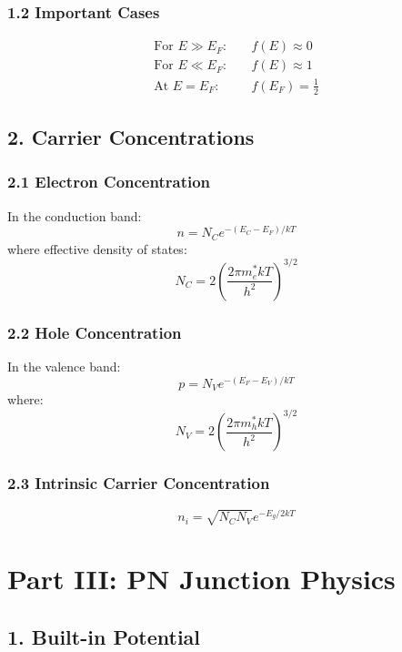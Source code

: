 \documentclass[12pt]{article}
\begin{document}
\subsubsection{1.2 Important Cases}
\begin{align*}
\text{For } E \gg E_F: & \quad f(E) \approx 0 \\
\text{For } E \ll E_F: & \quad f(E) \approx 1 \\
\text{At } E = E_F: & \quad f(E_F) = \frac{1}{2}
\end{align*}

\subsection{2. Carrier Concentrations}

\subsubsection{2.1 Electron Concentration}
In the conduction band:
\[
n = N_C e^{-(E_C - E_F)/kT}
\]
where effective density of states:
\[
N_C = 2\left(\frac{2\pi m_e^* kT}{h^2}\right)^{3/2}
\]

\subsubsection{2.2 Hole Concentration}
In the valence band:
\[
p = N_V e^{-(E_F - E_V)/kT}
\]
where:
\[
N_V = 2\left(\frac{2\pi m_h^* kT}{h^2}\right)^{3/2}
\]

\subsubsection{2.3 Intrinsic Carrier Concentration}
\[
n_i = \sqrt{N_C N_V} e^{-E_g/2kT}
\]

\section{Part III: PN Junction Physics}

\subsection{1. Built-in Potential}
\end{document}
